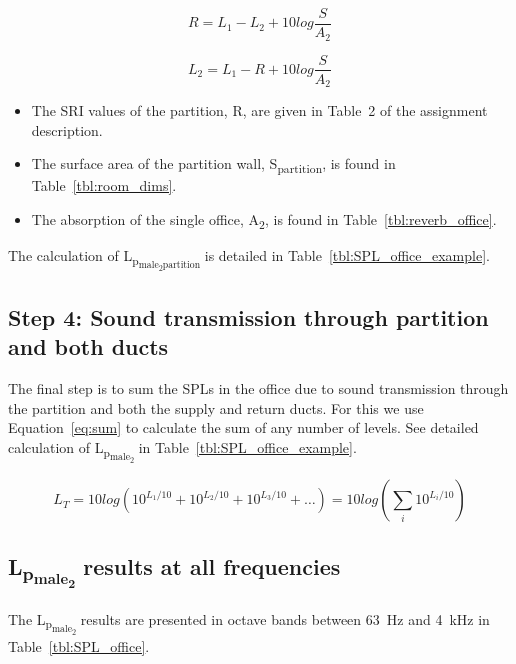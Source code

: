 	\begin{equation}\label{eq:SRI}
		R = L_1 - L_2 + 10 log \frac{S}{A_2}
	\end{equation}
	
	
	\begin{equation}\label{eq:SRI_rearranged}
		L_2 = L_1 - R + 10 log \frac{S}{A_2}
	\end{equation}

\begin{itemize}
	\item The SRI values of the partition, R, are given in Table~2 of the assignment description.
	\item The surface area of the partition wall, S\textsubscript{partition}, is found in Table~\ref{tbl:room_dims}.
	\item The absorption of the single office, A\textsubscript{2}, is found in Table~\ref{tbl:reverb_office}.
\end{itemize}

The calculation of L\textsubscript{p\textsubscript{male\textsubscript{2}partition}} is detailed in Table~\ref{tbl:SPL_office_example}.


\subsection{Step 4: Sound transmission through partition and both ducts}

The final step is to sum the SPLs in the office due to sound transmission through the partition and both the supply and return ducts.
For this we use Equation~\ref{eq:sum} to calculate the sum of any number of levels.
See detailed calculation of L\textsubscript{p\textsubscript{male\textsubscript{2}}} in Table~\ref{tbl:SPL_office_example}.

	\begin{equation}\label{eq:sum}
		L_T = 10 log \left(10^{L_1/10} + 10^{L_2/10} + 10^{L_3/10} + \ldots\right) = 10 log \left(\sum_{i}10^{L_i/10}\right)
	\end{equation}


\subsection{L\textsubscript{p\textsubscript{male\textsubscript{2}}} results at all frequencies}

The L\textsubscript{p\textsubscript{male\textsubscript{2}}} results are presented in octave bands between 63~Hz and 4~kHz in Table~\ref{tbl:SPL_office}.





